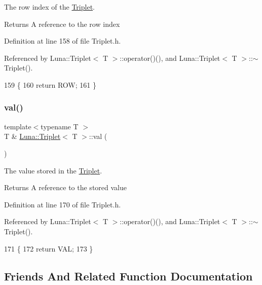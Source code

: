The row index of the \hyperlink{classLuna_1_1Triplet}{Triplet}. 

\begin{DoxyReturn}{Returns}
A reference to the row index 
\end{DoxyReturn}


Definition at line 158 of file Triplet.\+h.



Referenced by Luna\+::\+Triplet$<$ T $>$\+::operator()(), and Luna\+::\+Triplet$<$ T $>$\+::$\sim$\+Triplet().


\begin{DoxyCode}
159     \{
160         \textcolor{keywordflow}{return} ROW;
161     \}
\end{DoxyCode}
\mbox{\label{classLuna_1_1Triplet_a622ca1a37e1661cb4e2a5932fb6806a9}} 
\subsubsection{\texorpdfstring{val()}{val()}}
{\footnotesize\ttfamily template$<$typename T $>$ \\
T \& \hyperlink{classLuna_1_1Triplet}{Luna\+::\+Triplet}$<$ T $>$\+::val (\begin{DoxyParamCaption}{ }\end{DoxyParamCaption})\hspace{0.3cm}{\ttfamily [inline]}}



The value stored in the \hyperlink{classLuna_1_1Triplet}{Triplet}. 

\begin{DoxyReturn}{Returns}
A reference to the stored value 
\end{DoxyReturn}


Definition at line 170 of file Triplet.\+h.



Referenced by Luna\+::\+Triplet$<$ T $>$\+::operator()(), and Luna\+::\+Triplet$<$ T $>$\+::$\sim$\+Triplet().


\begin{DoxyCode}
171     \{
172         \textcolor{keywordflow}{return} VAL;
173     \}
\end{DoxyCode}


\subsection{Friends And Related Function Documentation}
\mbox{\label{classLuna_1_1Triplet_a2742a8732adbcb3f14119b23efae19e6}} 
